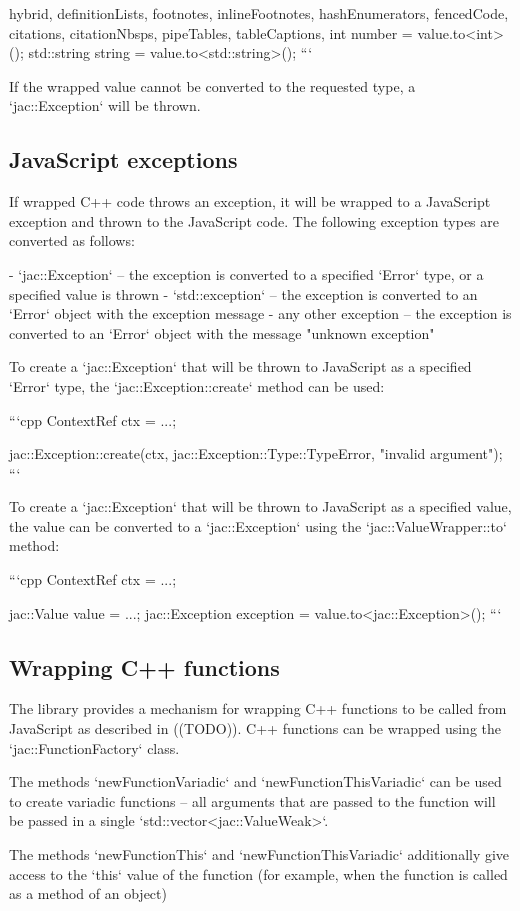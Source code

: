\documentclass[
  digital,
  oneside,
  nosansbold,
  nocolorbold,
  lof,
  lot
]{fithesis4}
\begin{document}
\begin{markdown*}{%
  hybrid,
  definitionLists,
  footnotes,
  inlineFootnotes,
  hashEnumerators,
  fencedCode,
  citations,
  citationNbsps,
  pipeTables,
  tableCaptions,
}
int number = value.to<int>();
std::string string = value.to<std::string>();
```

If the wrapped value cannot be converted to the requested type, a `jac::Exception` will be thrown.

\subsection{JavaScript exceptions}

If wrapped C++ code throws an exception, it will be wrapped to a JavaScript exception and thrown to the JavaScript code. The following exception types are converted as follows:

  - `jac::Exception` -- the exception is converted to a specified `Error` type, or a specified value is thrown
  - `std::exception` -- the exception is converted to an `Error` object with the exception message
  - any other exception -- the exception is converted to an `Error` object with the message "unknown exception"

To create a `jac::Exception` that will be thrown to JavaScript as a specified `Error` type, the `jac::Exception::create` method can be used:

```cpp
ContextRef ctx = ...;

jac::Exception::create(ctx, jac::Exception::Type::TypeError, "invalid argument");
```

To create a `jac::Exception` that will be thrown to JavaScript as a specified value, the value can be converted to a `jac::Exception` using the `jac::ValueWrapper::to` method:

```cpp
ContextRef ctx = ...;

jac::Value value = ...;
jac::Exception exception = value.to<jac::Exception>();
```

\subsection{Wrapping C++ functions}

The library provides a mechanism for wrapping C++ functions to be called from JavaScript as described in ((TODO)). C++ functions can be wrapped using the `jac::FunctionFactory` class.

The methods `newFunctionVariadic` and `newFunctionThisVariadic` can be used to create variadic functions -- all arguments that are
passed to the function will be passed in a single `std::vector<jac::ValueWeak>`.

The methods `newFunctionThis` and `newFunctionThisVariadic` additionally give access to the `this` value of the function (for example,
when the function is called as a method of an object)


\end{markdown*}
\end{document}
